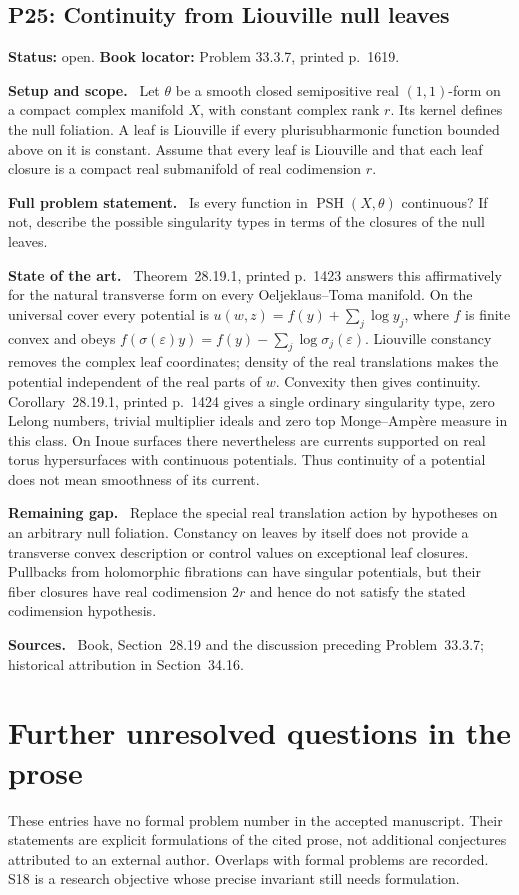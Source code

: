 \documentclass[11pt]{article}
\newcommand{\PSH}{\operatorname{PSH}}
\newcommand{\field}[1]{\par\medskip\noindent\textbf{#1.}\ }
\begin{document}
\subsection{P25: Continuity from Liouville null leaves}
\label{P25}
\noindent\textbf{Status:} open. \textbf{Book locator:} Problem 33.3.7, printed p.~1619.
\field{Setup and scope} Let $\theta$ be a smooth closed semipositive real $(1,1)$-form on a compact complex manifold $X$, with constant complex rank $r$. Its kernel defines the null foliation. A leaf is Liouville if every plurisubharmonic function bounded above on it is constant. Assume that every leaf is Liouville and that each leaf closure is a compact real submanifold of real codimension $r$.
\field{Full problem statement} Is every function in $\PSH(X,\theta)$ continuous? If not, describe the possible singularity types in terms of the closures of the null leaves.
\field{State of the art} Theorem~28.19.1, printed p.~1423 answers this affirmatively for the natural transverse form on every Oeljeklaus--Toma manifold. On the universal cover every potential is $u(w,z)=f(y)+\sum_j\log y_j$, where $f$ is finite convex and obeys $f(\sigma(\varepsilon)y)=f(y)-\sum_j\log\sigma_j(\varepsilon)$. Liouville constancy removes the complex leaf coordinates; density of the real translations makes the potential independent of the real parts of $w$. Convexity then gives continuity. Corollary~28.19.1, printed p.~1424 gives a single ordinary singularity type, zero Lelong numbers, trivial multiplier ideals and zero top Monge--Amp\`ere measure in this class. On Inoue surfaces there nevertheless are currents supported on real torus hypersurfaces with continuous potentials. Thus continuity of a potential does not mean smoothness of its current.
\field{Remaining gap} Replace the special real translation action by hypotheses on an arbitrary null foliation. Constancy on leaves by itself does not provide a transverse convex description or control values on exceptional leaf closures. Pullbacks from holomorphic fibrations can have singular potentials, but their fiber closures have real codimension $2r$ and hence do not satisfy the stated codimension hypothesis.
\field{Sources} Book, Section~28.19 and the discussion preceding Problem~33.3.7; historical attribution in Section~34.16.

\section{Further unresolved questions in the prose}
These entries have no formal problem number in the accepted manuscript. Their statements are explicit formulations of the cited prose, not additional conjectures attributed to an external author. Overlaps with formal problems are recorded. S18 is a research objective whose precise invariant still needs formulation.
\end{document}
